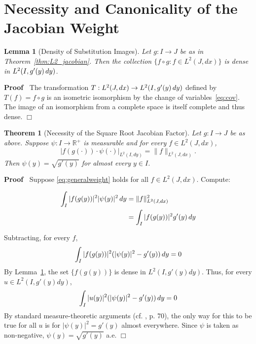 \documentclass{article}
\newenvironment{proof}{\noindent\textbf{Proof\ }}{\hspace*{\fill}$\Box$\medskip}
\newtheorem{lemma}{Lemma}
\newtheorem{theorem}{Theorem}
\begin{document}
\section{Necessity and Canonicality of the Jacobian Weight}

\begin{lemma}
  [Density of Substitution Images]\label{lem:L2density} Let $g : I \rightarrow
  J$ be as in Theorem~\ref{thm:L2_jacobian}. Then the collection $\{f \circ g
  : f \in L^2 (J, dx)\}$ is dense in $L^2 (I, g' (y) \hspace{0.17em} dy)$.
\end{lemma}

\begin{proof}
  The transformation $T : L^2 (J, dx) \to L^2 (I, g' (y) \hspace{0.17em} dy)$
  defined by $T (f) = f \circ g$ is an isometric isomorphism by the change of
  variables~\eqref{eq:cov}. The image of an isomorphism from a complete space
  is itself complete and thus dense.
\end{proof}

\begin{theorem}
  [Necessity of the Square Root Jacobian Factor]\label{thm:necessity} Let $g :
  I \to J$ be as above. Suppose $\psi : I \to \mathbb{R}^+$ is measurable and
  for every $f \in L^2 (J, dx)$,
  \begin{equation}
    \label{eq:generalweight} | f (g (\cdot)) \cdot \psi (\cdot) |_{L^2 (I,
    dy)} = \|f\|_{L^2 (J, dx)} .
  \end{equation}
  Then $\psi (y) = \sqrt{g' (y)}$ for almost every $y \in I$.
\end{theorem}

\begin{proof}
  Suppose \eqref{eq:generalweight} holds for all $f \in L^2 (J, dx)$. Compute:
  
  \begin{align}
    \int_I |f (g (y)) |^2 | \psi (y) |^2  \hspace{0.17em} dy & = \|f\|_{L^2
    (J, dx)}^2 \\
    & = \int_I |f (g (y)) |^2 g' (y)  \hspace{0.17em} dy  \label{eq:proofcov}
  \end{align}
  
  Subtracting, for every $f$,
  \begin{equation}
    \int_I |f (g (y)) |^2  (| \psi (y) |^2 - g' (y))  \hspace{0.17em} dy = 0
  \end{equation}
  By Lemma~\ref{lem:L2density}, the set $\{f (g (y))\}$ is dense in $L^2 (I,
  g' (y) dy)$. Thus, for every $u \in L^2 (I, g' (y) dy)$,
  \begin{equation}
    \int_I |u (y) |^2  (| \psi (y) |^2 - g' (y))  \hspace{0.17em} dy = 0
  \end{equation}
  By standard measure-theoretic arguments (cf. {\cite{Folland}}, p. 70), the
  only way for this to be true for all $u$ is for $| \psi (y) |^2 = g' (y)$
  almost everywhere. Since $\psi$ is taken as non-negative, $\psi (y) =
  \sqrt{g' (y)}$ a.e.
\end{proof}
\end{document}
